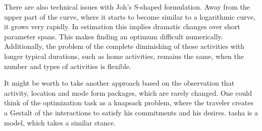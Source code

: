 There are also technical issues with Joh's S-shaped formulation. %
Away from the upper part of the curve, where it starts to become similar to a logarithmic curve, it grows very rapidly. 
In estimation this implies dramatic changes over short parameter spans. 
This makes finding an optimum difficult numerically. 
Additionally, the problem of the complete diminishing of those activities with longer typical durations, such as home activities, remains the same, when the number and types of activities is flexible.

It might be worth to take another approach based on the observation \citep[][and others]{SchlichEtAl_TransportRev_2004} that activity, location and mode form packages, which are rarely changed. 
One could think of the optimization task as a knapsack problem, where the traveler creates a Gestalt of the interactions to satisfy his commitments and his desires. 
\gls{tasha} is a model, which takes a similar stance. 


